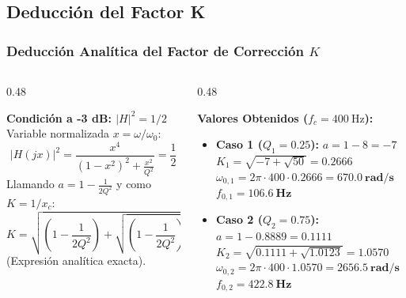 \documentclass[aspectratio=169, 10pt]{beamer}
\begin{document}
\subsection{Deducción del Factor K}
\begin{frame}
  \frametitle{Deducción Analítica del Factor de Corrección $K$}

  \begin{columns}[t, onlytextwidth]
    \begin{column}{0.48\textwidth}
      \begin{tarjeta}
        {\fontsize{9pt}{11pt}\selectfont \textbf{\color{NavyDark} Condición a -3 dB: $|H|^2 = 1/2$}}\\[2pt]
        {\fontsize{8pt}{10pt}\selectfont
        Variable normalizada $x = \omega / \omega_0$:
        \[ |H(jx)|^2 = \frac{x^4}{(1 - x^2)^2 + \frac{x^2}{Q^2}} = \frac{1}{2} \]
        Llamando $a = 1 - \frac{1}{2Q^2}$ y como $K = 1/x_c$:
        \[ K = \sqrt{\left(1 - \frac{1}{2Q^2}\right) + \sqrt{\left(1 - \frac{1}{2Q^2}\right)^2 + 1}} \]
        (Expresión analítica exacta).
        }
      \end{tarjeta}
    \end{column}

    \begin{column}{0.48\textwidth}
      \begin{tarjeta}[colframe=NavyDark]
        {\fontsize{9pt}{11pt}\selectfont \textbf{\color{NavyDark} Valores Obtenidos ($f_c = \qty{400}{\hertz}$):}}\\[2pt]
        {\fontsize{8pt}{10pt}\selectfont
        \begin{itemize}\setlength{\itemsep}{3pt}
          \item \textbf{Caso 1 ($Q_1 = 0.25$):}
          $a = 1 - 8 = -7$\\
          $K_1 = \sqrt{-7 + \sqrt{50}} = \mathbf{0.2666}$\\
          $\omega_{0,1} = 2\pi \cdot 400 \cdot 0.2666 = \mathbf{\qty{670.0}{\radian\per\second}}$\\
          $f_{0,1} = \mathbf{\qty{106.6}{\hertz}}$
          \item \textbf{Caso 2 ($Q_2 = 0.75$):}
          $a = 1 - 0.8889 = 0.1111$\\
          $K_2 = \sqrt{0.1111 + \sqrt{1.0123}} = \mathbf{1.0570}$\\
          $\omega_{0,2} = 2\pi \cdot 400 \cdot 1.0570 = \mathbf{\qty{2656.5}{\radian\per\second}}$\\
          $f_{0,2} = \mathbf{\qty{422.8}{\hertz}}$
        \end{itemize}
        }
      \end{tarjeta}
    \end{column}
  \end{columns}
\end{frame}
\end{document}
